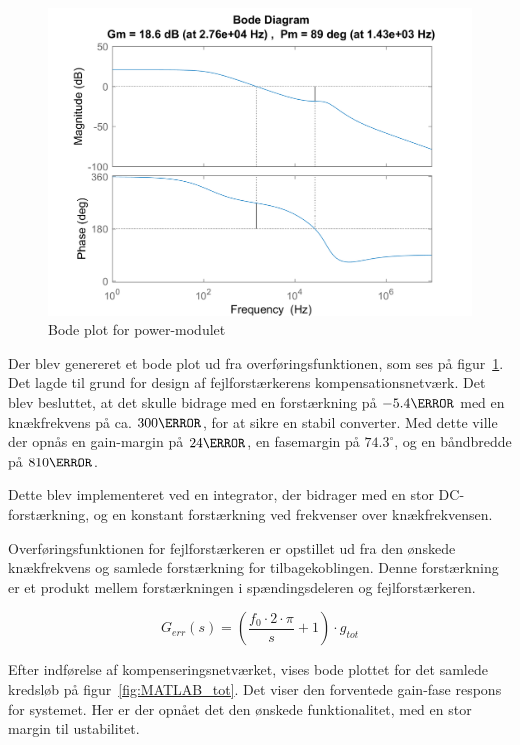 \begin{figure}[H]
	\center
	\includegraphics[max width=0.7\linewidth]{../dokumentation/tex/2iteration/billeder/MATLAB_power_module.PNG}
	\caption{Bode plot for power-modulet}
	\label{fig:MATLAB_power_module}
\end{figure}

\noindent Der blev genereret et bode plot ud fra overføringsfunktionen, som ses på figur~\ref{fig:MATLAB_power_module}. Det lagde til grund for design af fejlforstærkerens kompensationsnetværk. Det blev besluttet, at det skulle bidrage med en forstærkning på $-5.4\decibel$ med en knækfrekvens på ca. $300\hertz$, for at sikre en stabil converter. Med dette ville der opnås en gain-margin på $24\decibel$, en fasemargin på $74.3^\circ$, og en båndbredde på $810\hertz$.

Dette blev implementeret ved en integrator, der bidrager med en stor DC-forstærkning, og en konstant forstærkning ved frekvenser over knækfrekvensen. 

Overføringsfunktionen for fejlforstærkeren er opstillet ud fra den ønskede knækfrekvens og samlede forstærkning for tilbagekoblingen. Denne forstærkning er et produkt mellem forstærkningen i spændingsdeleren og fejlforstærkeren. 

\begin{equation} \label{H_err}
G_{err}(s) = \left(\frac{f_0 \cdot 2\cdot\pi}{s} + 1\right)  \cdot g_{tot}
\end{equation}

Efter indførelse af kompenseringsnetværket, vises bode plottet for det samlede kredsløb på figur~\ref{fig:MATLAB_tot}. Det viser den forventede gain-fase respons for systemet. Her er der opnået det den ønskede funktionalitet, med en stor margin til ustabilitet. 

